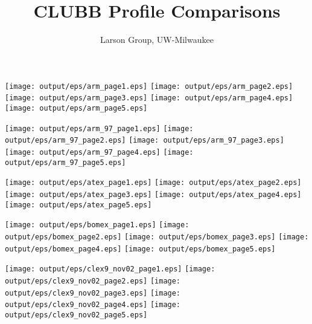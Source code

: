 \documentclass[11pt]{article}
\title{CLUBB Profile Comparisons}
\author{Larson Group, UW-Milwaukee}
\begin{document}
\begin{center}

\texttt{[image: output/eps/arm\_page1.eps]}
\texttt{[image: output/eps/arm\_page2.eps]}
\texttt{[image: output/eps/arm\_page3.eps]}
\texttt{[image: output/eps/arm\_page4.eps]}
\texttt{[image: output/eps/arm\_page5.eps]}
\end{center}
\newpage

\begin{center}

\texttt{[image: output/eps/arm\_97\_page1.eps]}
\texttt{[image: output/eps/arm\_97\_page2.eps]}
\texttt{[image: output/eps/arm\_97\_page3.eps]}
\texttt{[image: output/eps/arm\_97\_page4.eps]}
\texttt{[image: output/eps/arm\_97\_page5.eps]}
\end{center}
\newpage

\begin{center}

\texttt{[image: output/eps/atex\_page1.eps]}
\texttt{[image: output/eps/atex\_page2.eps]}
\texttt{[image: output/eps/atex\_page3.eps]}
\texttt{[image: output/eps/atex\_page4.eps]}
\texttt{[image: output/eps/atex\_page5.eps]}
\end{center}
\newpage


\begin{center}

\texttt{[image: output/eps/bomex\_page1.eps]}
\texttt{[image: output/eps/bomex\_page2.eps]}
\texttt{[image: output/eps/bomex\_page3.eps]}
\texttt{[image: output/eps/bomex\_page4.eps]}
\texttt{[image: output/eps/bomex\_page5.eps]}
\end{center}
\newpage

\begin{center}

\texttt{[image: output/eps/clex9\_nov02\_page1.eps]}
\texttt{[image: output/eps/clex9\_nov02\_page2.eps]}
\texttt{[image: output/eps/clex9\_nov02\_page3.eps]}
\texttt{[image: output/eps/clex9\_nov02\_page4.eps]}
\texttt{[image: output/eps/clex9\_nov02\_page5.eps]}
\end{center}
\newpage
\end{document}
